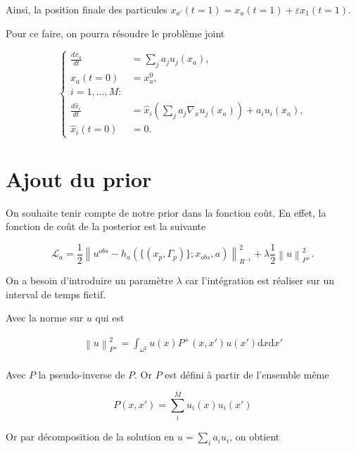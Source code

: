 \documentclass{article}
\newcommand{\norm}[1]{\left\lVert #1 \right\rVert}
\begin{document}
Ainsi, la position finale des particules $x_{a'}(t = 1) = x_{a}(t = 1) + \varepsilon x_1(t=1)$.

Pour ce faire, on pourra résoudre le problème joint

\begin{equation*}
    \begin{cases}
        \frac{dx_a}{dt}      & =  \sum_j a_j u_j(x_a),                                     \\
        x_a(t=0)             & =  x_a^0,                                                   \\
        i = 1, \dots, M:                                                                   \\
        \frac{d\hat x_i}{dt} & =  \hat x_i (\sum_j a_j  \nabla_x u_j(x_a)) + a_i u_i(x_a), \\
        \hat x_i(t=0)        & =  0.
    \end{cases}
\end{equation*}

\section{Ajout du prior}
On souhaite tenir compte de notre prior dans la fonction coût. En effet, la fonction de coût de la posterior est la suivante

\begin{equation*}
    \mathcal L_a =  \frac12 \norm{u^{obs} - h_a(\{(x_p, \Gamma_p)\}; x_{obs}, a)}^2_{R^{-1}} + \lambda \frac{1}{2} \norm{u}^2_{P^+}.
\end{equation*}

On a besoin d'introduire un paramètre $\lambda$ car l'intégration est réaliser sur un interval de temps fictif.

Avec la norme sur $u$ qui est

\begin{eqnarray*}
    \norm{u}^2_{P^+} = \int_{\omega^2} u(x) P^+(x, x') u(x') \mathrm{d}x\mathrm{d}x' \\
\end{eqnarray*}

Avec $P$ la pseudo-inverse de $P$. Or $P$ est défini à partir de l'ensemble même

\begin{equation*}
    P(x, x') = \sum_i^M  u_i(x) u_i(x')
\end{equation*}

Or par décomposition de la solution en $u = \sum_i a_i u_i$, on obtient
\end{document}
